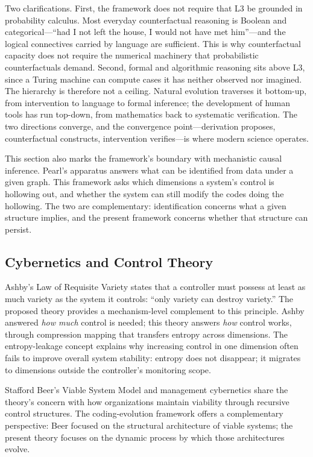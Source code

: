 \documentclass[11pt,a4paper]{article}
\begin{document}
Two clarifications. First, the framework does not require that L3 be grounded in probability calculus. Most everyday counterfactual reasoning is Boolean and categorical---``had I not left the house, I would not have met him''---and the logical connectives carried by language are sufficient. This is why counterfactual capacity does not require the numerical machinery that probabilistic counterfactuals demand. Second, formal and algorithmic reasoning sits above L3, since a Turing machine can compute cases it has neither observed nor imagined. The hierarchy is therefore not a ceiling. Natural evolution traverses it bottom-up, from intervention to language to formal inference; the development of human tools has run top-down, from mathematics back to systematic verification. The two directions converge, and the convergence point---derivation proposes, counterfactual constructs, intervention verifies---is where modern science operates.

This section also marks the framework's boundary with mechanistic causal inference. Pearl's apparatus answers what can be identified from data under a given graph. This framework asks which dimensions a system's control is hollowing out, and whether the system can still modify the codes doing the hollowing. The two are complementary: identification concerns what a given structure implies, and the present framework concerns whether that structure can persist.

\subsection{Cybernetics and Control Theory}

Ashby's Law of Requisite Variety \citep{ashby1956} states that a controller must possess at least as much variety as the system it controls: ``only variety can destroy variety.'' The proposed theory provides a mechanism-level complement to this principle. Ashby answered \textit{how much} control is needed; this theory answers \textit{how} control works, through compression mapping that transfers entropy across dimensions. The entropy-leakage concept explains why increasing control in one dimension often fails to improve overall system stability: entropy does not disappear; it migrates to dimensions outside the controller's monitoring scope.

Stafford Beer's Viable System Model \citep{beer1972, beer1979} and management cybernetics share the theory's concern with how organizations maintain viability through recursive control structures. The coding-evolution framework offers a complementary perspective: Beer focused on the structural architecture of viable systems; the present theory focuses on the dynamic process by which those architectures evolve.
\end{document}
